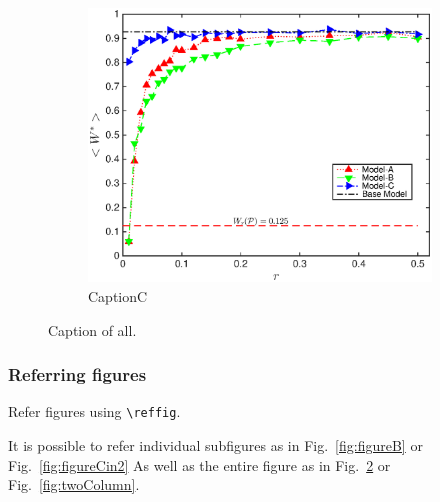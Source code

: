 \documentclass[10pt,journal,compsoc]{IEEEtran}
\newcommand{\reffig}[1]{Fig.~\ref{#1}}
\theoremstyle{plain}
\theoremstyle{definition}
\theoremstyle{remark}
\begin{document}
\begin{figure}[!tbp]
\begin{subfigure}{\columnwidth}
		\includegraphics[width=\columnwidth]
			{Fig-FigureC}
		\caption{CaptionC} 
		\label{fig:figureC}
	\end{subfigure}
	\caption{
		Caption of all.
	} %
	\label{fig:oneColumn}
\end{figure}




\subsubsection{Referring figures}

Refer figures using \verb!\reffig!.

It is possible to refer individual subfigures as in 
\reffig{fig:figureB} or
\reffig{fig:figureCin2}
As well as the entire figure as in 
\reffig{fig:oneColumn} or
\reffig{fig:twoColumn}.
\end{document}

